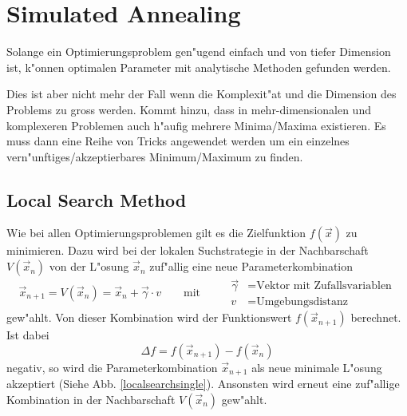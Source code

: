 %
%
%

\chapter{Simulated Annealing}

Solange ein Optimierungsproblem gen"ugend einfach und von tiefer
Dimension ist, k"onnen optimalen Parameter mit
analytische Methoden gefunden werden.

Dies ist aber nicht mehr der Fall wenn die Komplexit"at und die Dimension
des Problems zu gross werden.
Kommt hinzu, dass in mehr-dimensionalen und komplexeren Problemen auch
h"aufig mehrere Minima/Maxima existieren. Es muss dann eine Reihe von
Tricks angewendet werden um ein einzelnes vern"unftiges/akzeptierbares
Minimum/Maximum zu finden.
	
\section{Local Search Method}
Wie bei allen Optimierungsproblemen gilt es die Zielfunktion
$f(\vec{x})$ zu minimieren. Dazu wird bei der lokalen Suchstrategie
in der Nachbarschaft $V(\vec{x}_n)$ von der L"osung $\vec{x}_n$
zuf"allig eine neue Parameterkombination
\[
\vec{x}_{n+1} =
V(\vec{x}_n) = \vec{x}_n + \vec{\gamma} \cdot v \qquad \text{mit }
\qquad
\begin{aligned}
\vec{\gamma}&= \text{Vektor mit Zufallsvariablen}\\
v& = \text{Umgebungsdistanz}
\end{aligned}
\]
gew"ahlt. Von dieser Kombination
wird der Funktionswert $f(\vec{x}_{n+1})$ berechnet. Ist dabei
\[
\Delta f = f(\vec{x}_{n+1}) - f(\vec{x}_{n})
\]
negativ, so wird
die Parameterkombination $\vec{x}_{n+1}$ als neue minimale L"osung
akzeptiert (Siehe Abb. \ref{localsearchsingle}). Ansonsten wird erneut
eine zuf"allige Kombination in der Nachbarschaft $V(\vec{x}_n)$ gew"ahlt.

